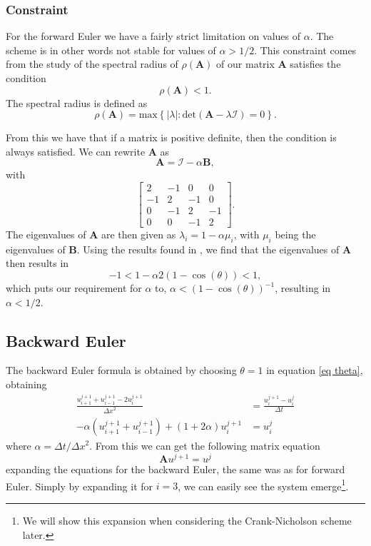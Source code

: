 \documentclass[%
reprint,
nofootinbib,
amsmath,amssymb,
aps,
]{revtex4-1}
\newcommand{\dt}{{\Delta t}}
\newcommand{\dx}{{\Delta x}}
\begin{document}
\subsubsection{Constraint}
For the forward Euler we have a fairly strict limitation on values of $\alpha$. The scheme is in other words not stable for values of $\alpha > 1/2$. This constraint comes from the study of the spectral radius of $\rho(\mathbf{A})$ of our matrix $\mathbf{A}$ satisfies the condition 
\begin{equation}
	\rho(\mathbf{A}) < 1. 
\end{equation}
The spectral radius is defined as\cite{morten}
\begin{equation}
	\rho(\mathbf{A}) = \text{max} \left\lbrace |\lambda| : \text{det}\left(\mathbf{A} - \lambda \mathcal{I}\right) = 0\right\rbrace.
\end{equation}

From this we have that if a matrix is positive definite, then the condition is always satisfied. We can rewrite $\mathbf{A}$ as 
\begin{equation}
	\mathbf{A} = \mathcal{I} - \alpha\mathbf{B},
\end{equation}
with 
\begin{equation}
	\begin{bmatrix}
		2 & -1 & 0 & 0 \\
		-1 & 2 & -1 & 0 \\
		0 &	-1 & 2 & -1 \\
		0 & 0 &	-1 & 2
	\end{bmatrix}.
\end{equation}
The eigenvalues of $\mathbf{A}$ are then given as $\lambda_i = 1 - \alpha\mu_i$, with $\mu_i$ being the eigenvalues of $\mathbf{B}$. Using the results found in \cite{morten}, we find that the eigenvalues of $\mathbf{A}$ then results in 
\begin{equation}
	-1 < 1-\alpha 2(1-\cos(\theta)) < 1, 
\end{equation}
which puts our requirement for $\alpha$ to, $\alpha < (1-\cos(\theta))^{-1}$, resulting in $\alpha < 1/2$. 


\subsection{Backward Euler}
The backward Euler formula is obtained by choosing $\theta = 1$ in equation \eqref{eq theta}, obtaining
\begin{align}
\frac{u_{i+1}^{j+1} + u_{i-1}^{j+1} - 2u_i^{j+1}}{\dx^2}&= 	\frac{u_i^{j+1} - u_i^j}{\dt} \\
	-\alpha \left(u_{i+1}^{j+1} + u_{i-1}^{j+1}\right) + \left(1+2\alpha\right)u_i^{j+1}&= u_i^j
\end{align}
where $\alpha = \dt/\dx^2$.
From this we can get the following matrix equation
\begin{equation}
	\mathbf{A}u^{j+1} = u^j
\end{equation}
expanding the equations for the backward Euler, the same was as for forward Euler. Simply by expanding it for $i=3$, we can easily see the system emerge\footnote{We will show this expansion when considering the Crank-Nicholson scheme later.}. 
\end{document}
